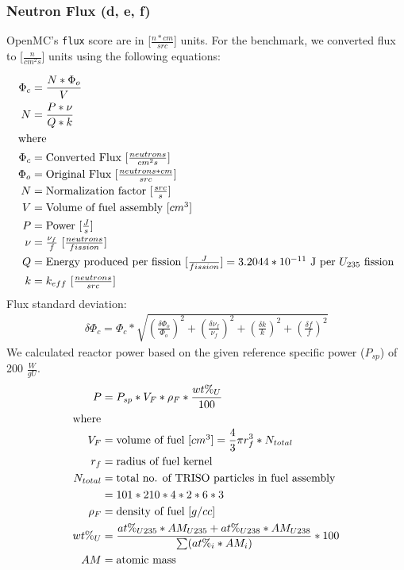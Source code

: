 \subsubsection{Neutron Flux (d, e, f)}
OpenMC's \texttt{flux} score are in [$\frac{n * cm}{src}$] units. 
For the benchmark, we converted flux to [$\frac{n}{cm^2s}$] units
using the following equations:  

\begin{align}
    \Phi_c &= \frac{N* \Phi_o}{V} \\
    N &= \frac{P*\nu}{Q*k} \\
    \intertext{where}
    \Phi_c &= \mbox{Converted Flux [$\frac{neutrons}{cm^2s}$]} \nonumber \\ 
    \Phi_o &= \mbox{Original Flux [$\frac{neutrons* cm}{src}$]} \nonumber \\
    N &= \mbox{Normalization factor [$\frac{src}{s}$]} \nonumber \\
    V &= \mbox{Volume of fuel assembly [$cm^3$]} \nonumber \\
    P &= \mbox{Power [$\frac{J}{s}$]} \nonumber \\
    \nu &= \mbox{$\frac{\nu_f}{f}$ [$\frac{neutrons}{fission}$]} \nonumber \\
    Q &= \mbox{Energy produced per fission [$\frac{J}{fission}$]} = \mbox{$3.2044*10^{-11}$ J per $U_{235}$ fission} \nonumber \\
    k &= \mbox{$k_{eff}$ [$\frac{neutrons}{src}$]} \nonumber 
\end{align}
Flux standard deviation: 
\begin{align}
    \delta \Phi_c = \Phi_c * 
    \sqrt{(\frac{\delta \Phi_o}{\Phi_o})^2+ (\frac{\delta \nu_f}{\nu_f})^2 
    + (\frac{\delta k}{k})^2 + (\frac{\delta f}{f})^2}
\end{align}
We calculated reactor power based on the given reference specific power 
($P_{sp}$) of 200 $\frac{W}{gU}$. 
\begin{align}
    P &= P_{sp} * V_F * \rho_F * \frac{wt\%_{U}}{100} \\
    \intertext{where}
    V_F &= \mbox{volume of fuel [$cm^3$]} = \frac{4}{3} \pi r_f^3 * N_{total} \nonumber \\
    r_f &= \mbox{radius of fuel kernel} \nonumber\\
    N_{total} &= \mbox{total no. of TRISO particles in fuel assembly} \nonumber\\ 
    &= 101 * 210 * 4 * 2 * 6 * 3 \nonumber\\
    \rho_F &= \mbox{density of fuel [$g/cc$]} \nonumber \\
    wt\%_{U} &= \frac{at\%_{U235} * AM_{U235} + at\%_{U238} * AM_{U238}}{\sum (at\%_i * AM_i)} * 100 \nonumber\\
    AM &= \mbox{atomic mass} \nonumber
\end{align}

